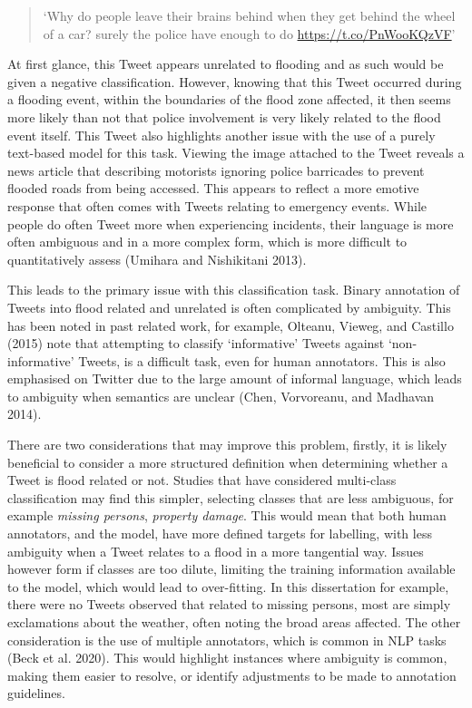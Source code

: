 \documentclass[a4paper, notitlepage]{extreport}
\begin{document}
\begin{quote}
`Why do people leave their brains behind when they get behind the wheel
of a car? surely the police have enough to do
\url{https://t.co/PnWooKQzVF}'
\end{quote}

At first glance, this Tweet appears unrelated to flooding and as such
would be given a negative classification. However, knowing that this
Tweet occurred during a flooding event, within the boundaries of the
flood zone affected, it then seems more likely than not that police
involvement is very likely related to the flood event itself. This Tweet
also highlights another issue with the use of a purely text-based model
for this task. Viewing the image attached to the Tweet reveals a news
article that describing motorists ignoring police barricades to prevent
flooded roads from being accessed. This appears to reflect a more
emotive response that often comes with Tweets relating to emergency
events. While people do often Tweet more when experiencing incidents,
their language is more often ambiguous and in a more complex form, which
is more difficult to quantitatively assess (Umihara and Nishikitani
2013).

This leads to the primary issue with this classification task. Binary
annotation of Tweets into flood related and unrelated is often
complicated by ambiguity. This has been noted in past related work, for
example, Olteanu, Vieweg, and Castillo (2015) note that attempting to
classify `informative' Tweets against `non-informative' Tweets, is a
difficult task, even for human annotators. This is also emphasised on
Twitter due to the large amount of informal language, which leads to
ambiguity when semantics are unclear (Chen, Vorvoreanu, and Madhavan
2014).

There are two considerations that may improve this problem, firstly, it
is likely beneficial to consider a more structured definition when
determining whether a Tweet is flood related or not. Studies that have
considered multi-class classification may find this simpler, selecting
classes that are less ambiguous, for example \emph{missing persons},
\emph{property damage}. This would mean that both human annotators, and
the model, have more defined targets for labelling, with less ambiguity
when a Tweet relates to a flood in a more tangential way. Issues however
form if classes are too dilute, limiting the training information
available to the model, which would lead to over-fitting. In this
dissertation for example, there were no Tweets observed that related to
missing persons, most are simply exclamations about the weather, often
noting the broad areas affected. The other consideration is the use of
multiple annotators, which is common in NLP tasks (Beck et al. 2020).
This would highlight instances where ambiguity is common, making them
easier to resolve, or identify adjustments to be made to annotation
guidelines.
\end{document}
